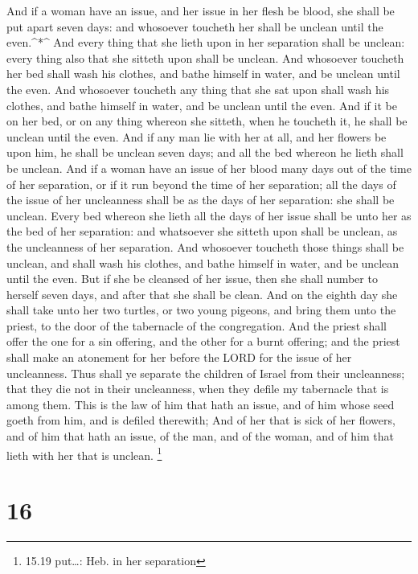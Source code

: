  And if a woman have an issue, and her issue in her flesh
be blood, she shall be put apart seven days: and whosoever toucheth her
shall be unclean until the even.\^{}*\^{}  And every thing
that she lieth upon in her separation shall be unclean: every thing also
that she sitteth upon shall be unclean.  And whosoever
toucheth her bed shall wash his clothes, and bathe himself in water, and
be unclean until the even.  And whosoever toucheth any
thing that she sat upon shall wash his clothes, and bathe himself in
water, and be unclean until the even.  And if it be on her
bed, or on any thing whereon she sitteth, when he toucheth it, he shall
be unclean until the even.  And if any man lie with her at
all, and her flowers be upon him, he shall be unclean seven days; and
all the bed whereon he lieth shall be unclean.  And if a
woman have an issue of her blood many days out of the time of her
separation, or if it run beyond the time of her separation; all the days
of the issue of her uncleanness shall be as the days of her separation:
she shall be unclean.  Every bed whereon she lieth all the
days of her issue shall be unto her as the bed of her separation: and
whatsoever she sitteth upon shall be unclean, as the uncleanness of her
separation.  And whosoever toucheth those things shall be
unclean, and shall wash his clothes, and bathe himself in water, and be
unclean until the even.  But if she be cleansed of her
issue, then she shall number to herself seven days, and after that she
shall be clean.  And on the eighth day she shall take unto
her two turtles, or two young pigeons, and bring them unto the priest,
to the door of the tabernacle of the congregation.  And the
priest shall offer the one for a sin offering, and the other for a burnt
offering; and the priest shall make an atonement for her before the LORD
for the issue of her uncleanness.  Thus shall ye separate
the children of Israel from their uncleanness; that they die not in
their uncleanness, when they defile my tabernacle that is among them.
 This is the law of him that hath an issue, and of him
whose seed goeth from him, and is defiled therewith;  And
of her that is sick of her flowers, and of him that hath an issue, of
the man, and of the woman, and of him that lieth with her that is
unclean. \footnote{15.19 put\ldots: Heb. in her separation}

\hypertarget{section-15}{%
\section{16}\label{section-15}}

